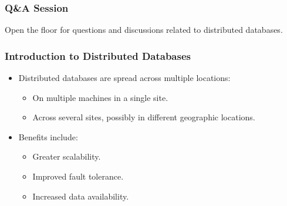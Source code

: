 \documentclass[aspectratio=169]{beamer}
\begin{document}
\begin{frame}[fragile]
  \frametitle{Q\&A Session}
  Open the floor for questions and discussions related to distributed databases.
\end{frame}

\begin{frame}[fragile]
  \frametitle{Introduction to Distributed Databases}
  \begin{itemize}
    \item Distributed databases are spread across multiple locations:
    \begin{itemize}
      \item On multiple machines in a single site.
      \item Across several sites, possibly in different geographic locations.
    \end{itemize}
    \item Benefits include:
    \begin{itemize}
      \item Greater scalability.
      \item Improved fault tolerance.
      \item Increased data availability.
    \end{itemize}
  \end{itemize}
\end{frame}
\end{document}
